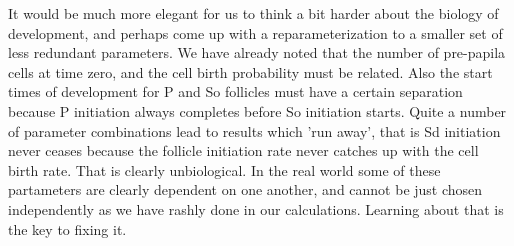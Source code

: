 \documentclass[titlepage]{article}  %
\begin{document}
It would be much more elegant for us to think a bit harder about the biology of development, and perhaps come up with a reparameterization to a smaller set of less redundant parameters. We have already noted that the number of pre-papila cells at time zero, and the cell birth probability must be related. Also the start times of development for P and So follicles must have a certain separation because P initiation always completes before So initiation starts. Quite a number of parameter combinations lead to results which 'run away', that is Sd initiation never ceases because the follicle initiation rate never catches up with the cell birth rate. That is clearly unbiological.  In the real world some of these partameters are clearly dependent on one another, and cannot be just chosen independently as we have rashly done in our calculations. Learning about that is the key to fixing it.
\end{document}
